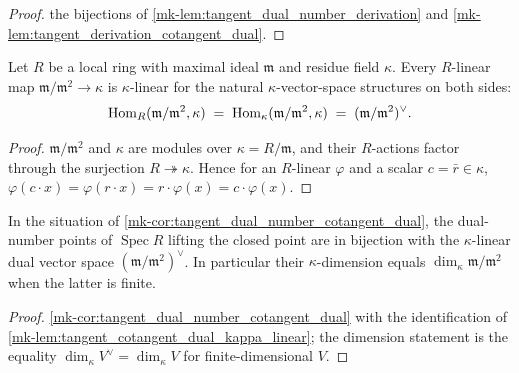 \begin{proof}
  \leanokCompose the bijections of
  \ref{mk-lem:tangent_dual_number_derivation} and
  \ref{mk-lem:tangent_derivation_cotangent_dual}.
\end{proof}

\begin{lemma}\label{mk-lem:tangent_cotangent_dual_kappa_linear}
  \leanok

  Let \(R\) be a local ring with maximal ideal \(\mathfrak m\) and
  residue field \(\kappa\). Every \(R\)-linear map
  \(\mathfrak m/\mathfrak m^2 \to \kappa\) is \(\kappa\)-linear for
  the natural \(\kappa\)-vector-space structures on both sides:
  \[
    \operatorname{Hom}_R(\mathfrak m/\mathfrak m^2, \kappa)
    \;=\;
    \operatorname{Hom}_\kappa(\mathfrak m/\mathfrak m^2, \kappa)
    \;=\; (\mathfrak m/\mathfrak m^2)^{\vee}.
  \]
\end{lemma}

\begin{proof}
  \leanokBoth \(\mathfrak m/\mathfrak m^2\) and \(\kappa\) are modules over
  \(\kappa = R/\mathfrak m\), and their \(R\)-actions factor through
  the surjection \(R \twoheadrightarrow \kappa\). Hence for an
  \(R\)-linear \(\varphi\) and a scalar \(c = \bar r \in \kappa\),
  \(\varphi(c \cdot x) = \varphi(r \cdot x) = r \cdot \varphi(x)
    = c \cdot \varphi(x)\).
\end{proof}

\begin{corollary}\label{mk-cor:tangent_dual_number_cotangent_space_dual}
  \leanok

  In the situation of \ref{mk-cor:tangent_dual_number_cotangent_dual},
  the dual-number points of \(\operatorname{Spec} R\) lifting the
  closed point are in bijection with the \(\kappa\)-linear dual
  vector space \((\mathfrak m/\mathfrak m^2)^{\vee}\). In particular
  their \(\kappa\)-dimension equals
  \(\dim_\kappa \mathfrak m/\mathfrak m^2\) when the latter is
  finite.
\end{corollary}

\begin{proof}
  \leanokCompose \ref{mk-cor:tangent_dual_number_cotangent_dual} with the
  identification of \ref{mk-lem:tangent_cotangent_dual_kappa_linear};
  the dimension statement is the equality
  \(\dim_\kappa V^{\vee} = \dim_\kappa V\) for finite-dimensional
  \(V\).
\end{proof}

